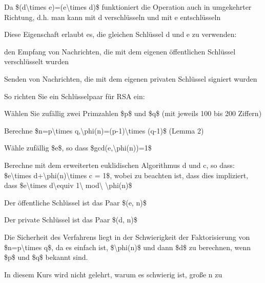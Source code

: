 \documentclass[a4paper]{article}
\begin{document}
\begin{multicols}{3}
\begin{itemize*}
\begin{itemize*}
            \end{itemize*}
            \item Da \$(d\textbackslash times e)=(e\textbackslash times d)\$
            funktioniert die Operation auch in umgekehrter Richtung, d.h. man kann
            mit d verschlüsseln und mit e entschlüsseln
            \begin{itemize*}
                  \item Diese Eigenschaft erlaubt es, die gleichen Schlüssel d und e zu verwenden:
                  \item den Empfang von Nachrichten, die mit dem eigenen öffentlichen Schlüssel verschlüsselt wurden
                  \item Senden von Nachrichten, die mit dem eigenen privaten Schlüssel signiert wurden
            \end{itemize*}
            \item So richten Sie ein Schlüsselpaar für RSA ein:
            \begin{itemize*}
                  \item Wählen Sie zufällig zwei Primzahlen \$p\$ und \$q\$ (mit jeweils 100 bis 200 Ziffern)
                  \item Berechne \$n=p\textbackslash times q,\textbackslash phi(n)=(p-1)\textbackslash times (q-1)\$ (Lemma 2)
                  \item Wähle zufällig \$e\$, so dass \$gcd(e,\textbackslash phi(n))=1\$
                  \item Berechne mit dem erweiterten euklidischen Algorithmus d und c, so dass: \$e\textbackslash times d+\textbackslash phi(n)\textbackslash times c = 1\$, wobei zu beachten ist, dass dies impliziert, dass \$e\textbackslash times d\textbackslash equiv 1\textbackslash{} mod\textbackslash{} \textbackslash phi(n)\$
                  \item Der öffentliche Schlüssel ist das Paar \$(e, n)\$
                  \item Der private Schlüssel ist das Paar \$(d, n)\$
            \end{itemize*}
            \item Die Sicherheit des Verfahrens liegt in der Schwierigkeit der
            Faktorisierung von \$n=p\textbackslash times q\$, da es einfach ist,
            \$\textbackslash phi(n)\$ und dann \$d\$ zu berechnen, wenn \$p\$ und
            \$q\$ bekannt sind.
            \item In diesem Kurs wird nicht gelehrt, warum es schwierig ist, große n zu

\end{itemize*}
\end{multicols}
\end{document}
